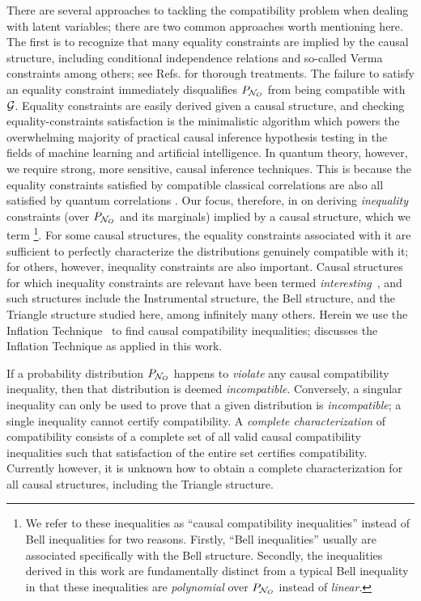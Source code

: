 \documentclass[aps, 10pt, english, twoside, pra, nofootinbib, tightenlines, longbibliography, superscriptaddress]{revtex4-1}
\begin{document}
    There are several approaches to tackling the compatibility problem when dealing with latent variables; there are two common approaches worth mentioning here. The first is to recognize that many equality constraints are implied by the causal structure, including conditional independence relations and so-called Verma constraints among others; see Refs. \cite{evans2015margins,evans2017markov} for thorough treatments. The failure to satisfy an equality constraint immediately disqualifies $\prob[\nodes_{O}]$ from being compatible with $\mathcal{G}$. Equality constraints are easily derived given a causal structure, and checking equality-constraints satisfaction is the minimalistic algorithm which powers the overwhelming majority of practical causal inference hypothesis testing in the fields of machine learning and artificial intelligence. In quantum theory, however, we require strong, more sensitive, causal inference techniques. This is because the equality constraints satisfied by compatible classical correlations are also all satisfied by quantum correlations \cite{Henson_2014}.
    Our focus, therefore, in on deriving \emph{inequality} constraints (over $\prob[\nodes_{O}]$ and its marginals) implied by a causal structure, which we term \footnote{We refer to these inequalities as ``causal compatibility inequalities'' instead of Bell inequalities for two reasons. Firstly, ``Bell inequalities'' usually are associated specifically with the Bell structure. Secondly, the inequalities derived in this work are fundamentally distinct from a typical Bell inequality in that these inequalities are \textit{polynomial} over $\prob[\nodes_{O}]$ instead of \textit{linear}.}. For some causal structures, the equality constraints associated with it are sufficient to perfectly characterize the distributions genuinely compatible with it; for others, however, inequality constraints are also important. Causal structures for which inequality constraints are relevant have been termed \textit{interesting}~\cite{Henson_2014}, and such structures include the Instrumental structure, the Bell structure, and the Triangle structure studied here, among infinitely many others.
    Herein we use the Inflation Technique~\cite{Inflation} to find causal compatibility inequalities;  discusses the Inflation Technique as applied in this work.

    If a probability distribution $\prob[\nodes_{O}]$ happens to \textit{violate} any causal compatibility inequality, then that distribution is deemed \textit{incompatible}.  Conversely, a singular inequality can only be used to prove that a given distribution is \textit{incompatible}; a single inequality cannot certify compatibility. A \textit{complete characterization} of compatibility consists of a complete set of all valid causal compatibility inequalities such that satisfaction of the entire set certifies compatibility. Currently however, it is unknown how to obtain a complete characterization for all causal structures, including the Triangle structure.
\end{document}
